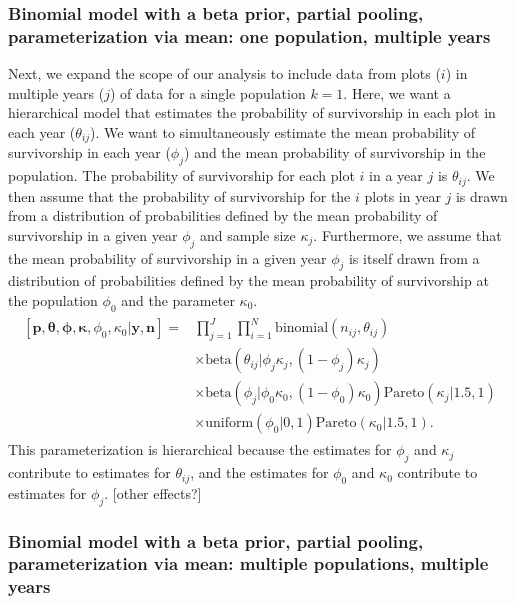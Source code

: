 \documentclass[12pt, oneside, titlepage]{article}   	%
\begin{document}
\subsubsection*{Binomial model with a beta prior, partial pooling, parameterization via mean: one population, multiple years}

Next, we expand the scope of our analysis to include data from plots ($i$) in multiple years ($j$) of data for a single population $k=1$. Here, we want a hierarchical model that estimates the probability of survivorship in each plot in each year ($\theta_{ij}$). We want to simultaneously estimate the mean probability of survivorship in each year ($\phi_j$) and the mean probability of survivorship in the population. The probability of survivorship for each plot $i$ in a year $j$ is $\theta_{ij}$. We then assume that the probability of survivorship for the $i$ plots in year $j$ is drawn from a distribution of probabilities defined by the mean probability of survivorship in a given year $\phi_j$ and sample size $\kappa_j$. Furthermore, we assume that the mean probability of survivorship in a given year $\phi_j$ is itself drawn from a distribution of probabilities defined by the mean probability of survivorship at the population $\phi_0$ and the parameter $\kappa_0$. 
%
\begin{align}
  \begin{split}
[\bm{p},\bm{\theta},\bm{\phi},\bm{\kappa},\phi_0,\kappa_0|\bm{y},\bm{n}]  = & \prod_{j=1}^J\prod_{i=1}^N \mathrm{binomial}(n_{ij},\theta_{ij}) 
    \\ & \times \mathrm{beta} (  \theta_{ij} | \phi_j \kappa_j , (1-\phi_j) \kappa_j ) 
    \\ & \times \mathrm{beta} (  \phi_{j} | \phi_0 \kappa_0 , (1- \phi_0) \kappa_0 )  \mathrm{Pareto} ( \kappa_j | 1.5, 1 ) 
    \\ & \times \mathrm{uniform} ( \phi_0 | 0 , 1) \mathrm{Pareto} ( \kappa_0 | 1.5, 1 ). \label{eq:bayesianHyearpop} 
      \end{split}
\end{align}
%
This parameterization is hierarchical because the estimates for $\phi_j$ and $\kappa_j$ contribute to estimates for $\theta_{ij}$, and the estimates for $\phi_0$ and $\kappa_0$ contribute to estimates for $\phi_j$. [other effects?]

\subsubsection*{Binomial model with a beta prior, partial pooling, parameterization via mean: multiple populations, multiple years}
\end{document}
